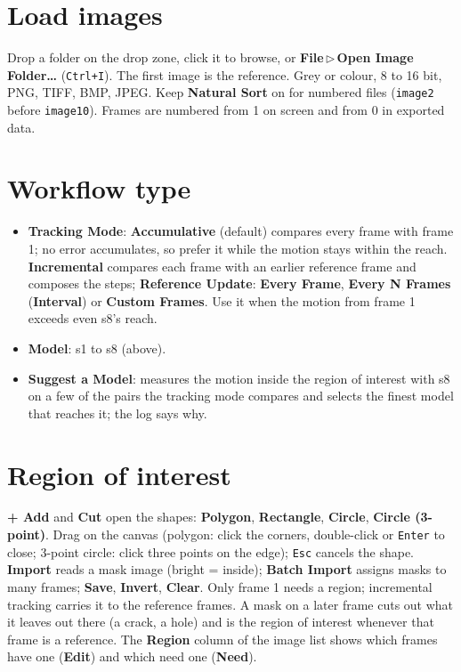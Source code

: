 \documentclass[10pt,letterpaper,twocolumn]{article}
\newcommand{\ui}[1]{\textbf{#1}}
\newcommand{\menu}[2]{\textbf{#1}\,$\triangleright$\,\textbf{#2}}
\newcommand{\file}[1]{\texttt{#1}}
\begin{document}
\section{Load images}
Drop a folder on the drop zone, click it to browse, or \menu{File}{Open Image Folder…}
(\texttt{Ctrl+I}). The first image is the reference. Grey or colour, 8 to 16 bit, PNG, TIFF, BMP,
JPEG. Keep \ui{Natural Sort} on for numbered files (\file{image2} before \file{image10}).
Frames are numbered from 1 on screen and from 0 in exported data.

\section{Workflow type}
\begin{itemize}
  \item \ui{Tracking Mode}: \ui{Accumulative} (default) compares every frame with frame 1; no
        error accumulates, so prefer it while the motion stays within the reach.
        \ui{Incremental} compares each frame with an earlier reference frame and composes the
        steps; \ui{Reference Update}: \ui{Every Frame}, \ui{Every N Frames} (\ui{Interval}) or
        \ui{Custom Frames}. Use it when the motion from frame 1 exceeds even s8's reach.
  \item \ui{Model}: s1 to s8 (above).
  \item \ui{Suggest a Model}: measures the motion inside the region of interest with s8 on a few
        of the pairs the tracking mode compares and selects the finest model that reaches it; the
        log says why.
\end{itemize}

\section{Region of interest}
\ui{+ Add} and \ui{Cut} open the shapes: \ui{Polygon}, \ui{Rectangle}, \ui{Circle},
\ui{Circle (3-point)}. Drag on the canvas (polygon: click the corners, double-click or
\texttt{Enter} to close; 3-point circle: click three points on the edge); \texttt{Esc} cancels
the shape. \ui{Import} reads a mask image (bright =
inside); \ui{Batch Import} assigns masks to many frames; \ui{Save}, \ui{Invert}, \ui{Clear}. Only
frame 1 needs a region; incremental tracking carries it to the reference frames. A mask on a
later frame cuts out what it leaves out there (a crack, a hole) and is the region of interest
whenever that frame is a reference. The \ui{Region} column of the image list shows which frames
have one (\ui{Edit}) and which need one (\ui{Need}).
\end{document}
